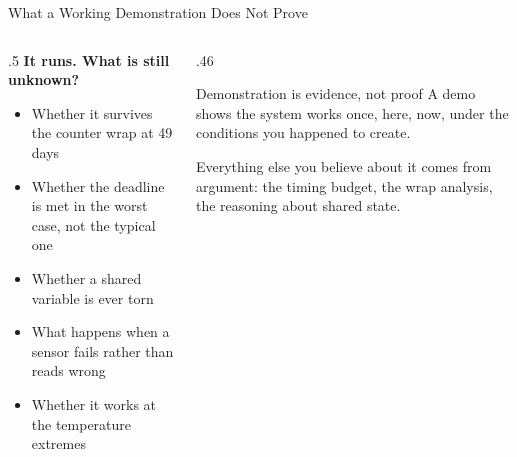 \documentclass[9pt,aspectratio=169,xcolor=table]{beamer}
\begin{document}
\begin{frame}{What a Working Demonstration Does Not Prove}
    \begin{columns}[T]
    \begin{column}{.5\textwidth}
        \textbf{It runs. What is still unknown?}
        {\small
        \begin{itemize}\itemsep1pt
            \item Whether it survives the \alert{counter wrap} at 49 days
            \item Whether the deadline is met in the \alert{worst case}, not the
                  typical one
            \item Whether a shared variable is ever \alert{torn}
            \item What happens when a sensor \alert{fails} rather than reads wrong
            \item Whether it works at the \alert{temperature extremes}
        \end{itemize}}
    \end{column}
    \begin{column}{.46\textwidth}
        \begin{block}{Demonstration is evidence, not proof}
            A demo shows the system works \alert{once, here, now}, under the
            conditions you happened to create.

            \vspace{2mm}
            Everything else you believe about it comes from \alert{argument}: the
            timing budget, the wrap analysis, the reasoning about shared state.
        \end{block}
    \end{column}
    \end{columns}
\end{frame}
\end{document}
